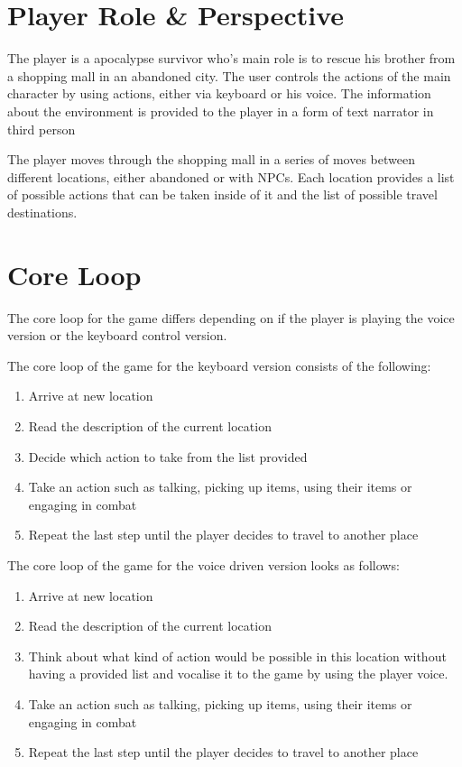
\section{Player Role \& Perspective}

The player is a apocalypse survivor who's main role is to rescue his brother
from a shopping mall in an abandoned city. The user controls the actions of the 
main character by using actions, either via keyboard or his voice. The information
about the environment is provided to the player in a form of text narrator in third person

The player moves through the shopping mall in a series of moves between different locations, 
either abandoned or with NPCs. Each location provides a list of possible actions that can be taken
inside of it and the list of possible travel destinations. 


\section{Core Loop}



The core loop for the game differs depending on if the player is playing the 
voice version or the keyboard control version.

The core loop of the game for the keyboard version consists of the following:

\begin{enumerate}
    \item Arrive at new location
    \item Read the description of the current location
    \item Decide which action to take from the list provided  
    \item Take an action such as talking, picking up items, using their items or
    engaging in combat
    \item Repeat the last step until the player decides to travel to another place 
\end{enumerate}


The core loop of the game for the voice driven version looks as follows:

\begin{enumerate}
    \item Arrive at new location
    \item Read the description of the current location
    \item Think about what kind of action would be possible in this location
    without having a provided list and vocalise it to the game by using the player voice.
    \item Take an action such as talking, picking up items, using their items or
    engaging in combat
    \item Repeat the last step until the player decides to travel to another place 
\end{enumerate}


